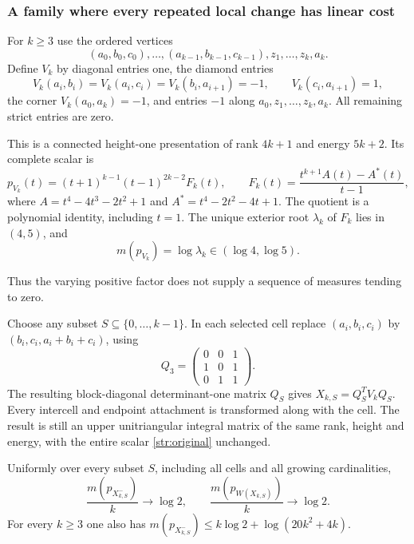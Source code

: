 \subsubsection{A family where every repeated local change has linear cost}
\label{str:repeated}

For $k\geq3$ use the ordered vertices
\[
 (a_0,b_0,c_0),\ldots,(a_{k-1},b_{k-1},c_{k-1}),
 z_1,\ldots,z_k,a_k.
\]
Define $V_k$ by diagonal entries one, the diamond entries
\[
 V_k(a_i,b_i)=V_k(a_i,c_i)=V_k(b_i,a_{i+1})=-1,
 \qquad V_k(c_i,a_{i+1})=1,
\]
the corner $V_k(a_0,a_k)=-1$, and entries $-1$ along $a_0,z_1,\ldots,z_k,a_k$.
All remaining strict entries are zero.
\begin{proposition}\label{str:base-family}
This is a connected height-one presentation of rank $4k+1$ and energy $5k+2$.
Its complete scalar is
\begin{equation}\label{str:original}
 p_{V_k}(t)=(t+1)^{k-1}(t-1)^{2k-2}F_k(t),\qquad
 F_k(t)=\frac{t^{k+1}A(t)-A^*(t)}{t-1},
\end{equation}
where $A=t^4-4t^3-2t^2+1$ and $A^*=t^4-2t^2-4t+1$.
The quotient is a polynomial identity, including $t=1$.
The unique exterior root $\lambda_k$ of $F_k$ lies in $(4,5)$, and
\begin{equation}\label{str:original-cost}
 m(p_{V_k})=\log\lambda_k\in(\log4,\log5).
\end{equation}
\end{proposition}
Thus the varying positive factor does not supply a sequence of measures tending to zero.

Choose any subset $S\subseteq\{0,\ldots,k-1\}$.
In each selected cell replace $(a_i,b_i,c_i)$ by $(b_i,c_i,a_i+b_i+c_i)$, using
\[
 Q_3=\begin{pmatrix}0&0&1\\1&0&1\\0&1&1\end{pmatrix}.
\]
The resulting block-diagonal determinant-one matrix $Q_S$ gives $X_{k,S}=Q_S^TV_kQ_S$.
Every intercell and endpoint attachment is transformed along with the cell.
The result is still an upper unitriangular integral matrix of the same rank, height and energy, with the entire scalar \eqref{str:original} unchanged.

\begin{theorem}\label{str:uniform-cost}
Uniformly over every subset $S$, including all cells and all growing cardinalities,
\[
 \frac{m(p_{X_{k,S}^-})}{k}\longrightarrow\log2,
 \qquad
 \frac{m(p_{W(X_{k,S})})}{k}\longrightarrow\log2.
\]
For every $k\geq3$ one also has $m(p_{X_{k,S}^-})\leq k\log2+\log(20k^2+4k)$.
\end{theorem}

